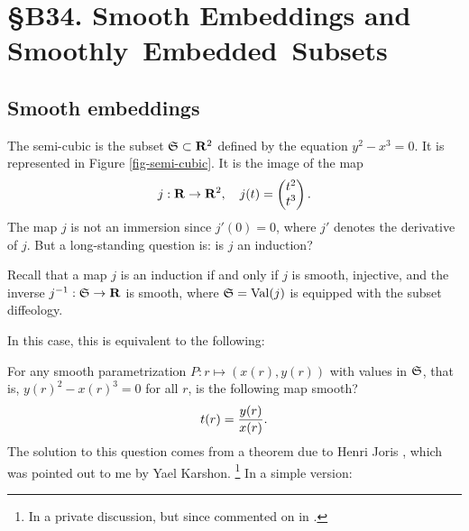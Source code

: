 
\chapter*{\S B34. Smooth Embeddings and \hbox{Smoothly Embedded Subsets}}
\setcounter{footnote}{0}


\begin{abstract}
  Since Henri Joris's paper we have known that,
  paradoxically,
  the semi-cubic $y^2 - x^3 = 0$ is an embedded submanifold of $\RR^2$.
  So,
  how are we to understand the singularity of the cusp?
  The answer is that,
  although the cusp is embedded,
  it is not smoothly embedded.
  This note will detail this aspect.
\end{abstract}


\section{Smooth embeddings}

The semi-cubic is the subset ${\mathfrak S} \subset \mathbf{R}^2$ defined by the equation $y^2 - x^3 = 0$.
It is represented in Figure \ref{fig-semi-cubic}.
It is the image of the map
$$
  j : \mathbf{R} \to \mathbf{R}^2, \quad j(t) = \begin{pmatrix}t^2 \\ t^3\end{pmatrix}.
  $$
The map $j$ is not an immersion since $j'(0) = 0$,
where $j'$ denotes the derivative of $j$.
But a long-standing question is:
is $j$ an induction?

Recall that a map $j$ is an induction \cite[\textsection\,1.29]{PIZ13} if and only if
$j$ is smooth,
injective,
and the inverse $j^{-1} : {\mathfrak S} \to \mathbf{R}$ is smooth,
where ${\mathfrak S} = \operatorname{Val}(j)$ is equipped with the subset diffeology.

In this case,
this is equivalent to the following:

 For any smooth parametrization $P : r \mapsto (x(r),y(r))$ with values in ${\mathfrak S}$,
that is,
$y(r)^2 - x(r)^3 = 0$ for all $r$,
is the following map smooth?
$$
  t(r) = {y(r) \over x(r)}.
  $$
The solution to this question comes from a theorem due to Henri Joris \cite{Jor82},
which was pointed out to me by Yael Karshon.%
\footnote{In a private discussion,
but since commented on in \cite{KMW22}.}
In a simple version:

